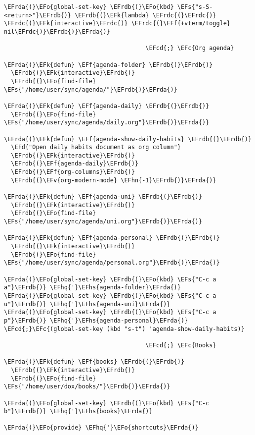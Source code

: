 \documentclass[a4wide,10pt]{article}
\newcommand{\EFc}[1]{\textcolor{EFc}{#1}} %
\newcommand{\EFcd}[1]{\textcolor{EFcd}{#1}} %
\newcommand{\EFs}[1]{\textcolor{EFs}{#1}} %
\newcommand{\EFd}[1]{\textcolor{EFd}{#1}} %
\newcommand{\EFk}[1]{\textcolor{EFk}{#1}} %
\newcommand{\EFf}[1]{\textcolor{EFf}{#1}} %
\newcommand{\EFv}[1]{\textcolor{EFv}{#1}} %
\newcommand{\EFo}[1]{\textcolor{EFo}{#1}} %
\newcommand{\EFhn}[1]{\textcolor{EFhn}{\textbf{#1}}} %
\newcommand{\EFhq}[1]{\textcolor{EFhq}{#1}} %
\newcommand{\EFhs}[1]{\textcolor{EFhs}{#1}} %
\newcommand{\EFrda}[1]{\textcolor{EFrda}{#1}} %
\newcommand{\EFrdb}[1]{\textcolor{EFrdb}{#1}} %
\newcommand{\EFrdc}[1]{\textcolor{EFrdc}{#1}} %
\begin{document}
\begin{Code}
\begin{Verbatim}
\EFrda{(}\EFo{global-set-key} \EFrdb{(}\EFo{kbd} \EFs{"s-S-<return>"}\EFrdb{)} \EFrdb{(}\EFk{lambda} \EFrdc{(}\EFrdc{)} \EFrdc{(}\EFk{interactive}\EFrdc{)} \EFrdc{(}\EFf{+vterm/toggle} nil\EFrdc{)}\EFrdb{)}\EFrda{)}

                                        \EFcd{;} \EFc{Org agenda}

\EFrda{(}\EFk{defun} \EFf{agenda-folder} \EFrdb{(}\EFrdb{)}
  \EFrdb{(}\EFk{interactive}\EFrdb{)}
  \EFrdb{(}\EFo{find-file} \EFs{"/home/user/sync/agenda/"}\EFrdb{)}\EFrda{)}

\EFrda{(}\EFk{defun} \EFf{agenda-daily} \EFrdb{(}\EFrdb{)}
  \EFrdb{(}\EFo{find-file} \EFs{"/home/user/sync/agenda/daily.org"}\EFrdb{)}\EFrda{)}

\EFrda{(}\EFk{defun} \EFf{agenda-show-daily-habits} \EFrdb{(}\EFrdb{)}
  \EFd{"Open daily habits document as org column"}
  \EFrdb{(}\EFk{interactive}\EFrdb{)}
  \EFrdb{(}\EFf{agenda-daily}\EFrdb{)}
  \EFrdb{(}\EFf{org-columns}\EFrdb{)}
  \EFrdb{(}\EFv{org-modern-mode} \EFhn{-1}\EFrdb{)}\EFrda{)}

\EFrda{(}\EFk{defun} \EFf{agenda-uni} \EFrdb{(}\EFrdb{)}
  \EFrdb{(}\EFk{interactive}\EFrdb{)}
  \EFrdb{(}\EFo{find-file} \EFs{"/home/user/sync/agenda/uni.org"}\EFrdb{)}\EFrda{)}

\EFrda{(}\EFk{defun} \EFf{agenda-personal} \EFrdb{(}\EFrdb{)}
  \EFrdb{(}\EFk{interactive}\EFrdb{)}
  \EFrdb{(}\EFo{find-file} \EFs{"/home/user/sync/agenda/personal.org"}\EFrdb{)}\EFrda{)}

\EFrda{(}\EFo{global-set-key} \EFrdb{(}\EFo{kbd} \EFs{"C-c a a"}\EFrdb{)} \EFhq{'}\EFhs{agenda-folder}\EFrda{)}
\EFrda{(}\EFo{global-set-key} \EFrdb{(}\EFo{kbd} \EFs{"C-c a u"}\EFrdb{)} \EFhq{'}\EFhs{agenda-uni}\EFrda{)}
\EFrda{(}\EFo{global-set-key} \EFrdb{(}\EFo{kbd} \EFs{"C-c a p"}\EFrdb{)} \EFhq{'}\EFhs{agenda-personal}\EFrda{)}
\EFcd{;}\EFc{(global-set-key (kbd "s-t") 'agenda-show-daily-habits)}

                                        \EFcd{;} \EFc{Books}

\EFrda{(}\EFk{defun} \EFf{books} \EFrdb{(}\EFrdb{)}
  \EFrdb{(}\EFk{interactive}\EFrdb{)}
  \EFrdb{(}\EFo{find-file} \EFs{"/home/user/dox/books/"}\EFrdb{)}\EFrda{)}

\EFrda{(}\EFo{global-set-key} \EFrdb{(}\EFo{kbd} \EFs{"C-c b"}\EFrdb{)} \EFhq{'}\EFhs{books}\EFrda{)}

\EFrda{(}\EFo{provide} \EFhq{'}\EFo{shortcuts}\EFrda{)}
\end{Verbatim}
\end{Code}
\end{document}
